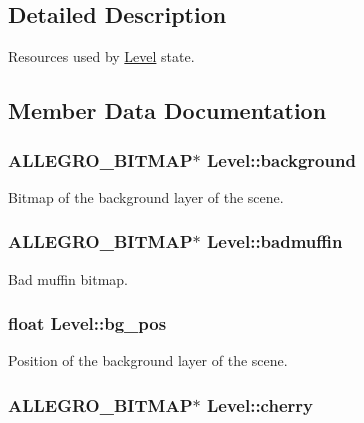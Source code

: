 \subsection{\-Detailed \-Description}
\-Resources used by \hyperlink{structLevel}{\-Level} state. 

\subsection{\-Member \-Data \-Documentation}
\hypertarget{structLevel_a4b4dd31284206502977b3d5b95d52abc}{
\subsubsection[{background}]{\setlength{\rightskip}{0pt plus 5cm}\-A\-L\-L\-E\-G\-R\-O\-\_\-\-B\-I\-T\-M\-A\-P$\ast$ {\bf \-Level\-::background}}}\label{structLevel_a4b4dd31284206502977b3d5b95d52abc}
\-Bitmap of the background layer of the scene. \hypertarget{structLevel_addc469e6a9843c509fc640a4e625fa50}{
\subsubsection[{badmuffin}]{\setlength{\rightskip}{0pt plus 5cm}\-A\-L\-L\-E\-G\-R\-O\-\_\-\-B\-I\-T\-M\-A\-P$\ast$ {\bf \-Level\-::badmuffin}}}\label{structLevel_addc469e6a9843c509fc640a4e625fa50}
\-Bad muffin bitmap. \hypertarget{structLevel_a00321214fdc30f67615053d1ca614948}{
\subsubsection[{bg\-\_\-pos}]{\setlength{\rightskip}{0pt plus 5cm}float {\bf \-Level\-::bg\-\_\-pos}}}\label{structLevel_a00321214fdc30f67615053d1ca614948}
\-Position of the background layer of the scene. \hypertarget{structLevel_a6f99b0cb9d6bbba1fd903bc304205270}{
\subsubsection[{cherry}]{\setlength{\rightskip}{0pt plus 5cm}\-A\-L\-L\-E\-G\-R\-O\-\_\-\-B\-I\-T\-M\-A\-P$\ast$ {\bf \-Level\-::cherry}}}\label{structLevel_a6f99b0cb9d6bbba1fd903bc304205270}
